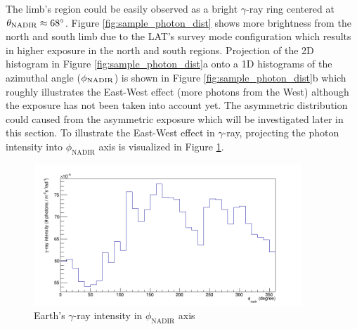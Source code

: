 The limb's region could be easily observed as a bright $\gamma$-ray ring centered
at $\theta_{\rm NADIR}\approx68^\circ$.
Figure \ref{fig:sample_photon_dist} shows more
brightness from the north and south limb
due to the LAT's survey mode configuration which results in
higher exposure in the north and south regions.
Projection of the 2D histogram in
Figure \ref{fig:sample_photon_dist}a onto a 1D histograms
of the azimuthal angle ($\phi_{\rm NADIR}$) is shown in Figure
\ref{fig:sample_photon_dist}b which roughly
illustrates the East-West effect
(more photons from the West) although the exposure has not
been taken into account yet. The asymmetric distribution
could caused from the asymmetric exposure which will be 
investigated later in this section.
To illustrate the East-West effect in $\gamma$-ray,
projecting the photon intensity into $\phi_\text{NADIR}$ axis is 
visualized in Figure \ref{fig:flx_phi}.



\begin{figure}[h!]
    \centering
    \includegraphics[width=0.9\textwidth]{content/result_and_discussion/figures/zoom_rs/flx_phi_nadir_hist.png}
    \caption{Earth's $\gamma$-ray intensity in $\phi_\text{NADIR}$ axis}
    \label{fig:flx_phi}
\end{figure}



